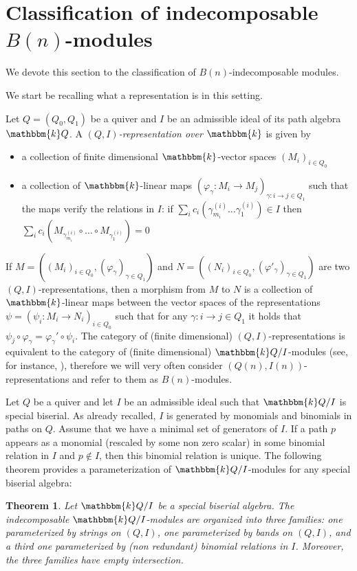 \documentclass[11pt]{amsart}
\newtheorem{theorem}{Theorem}[section]
\theoremstyle{definition}
\newcommand{\kk}{\mathbbm{k}}
\begin{document}
\section{Classification of indecomposable $B(n)$-modules}\label{sec : RepTh of B(r)}
We devote this section to the classification of $B(n)$-indecomposable modules. 

We start be recalling what a representation is in this setting.

Let $Q=(Q_0,Q_1)$ be a quiver and $I$ be an admissible ideal of its path algebra $\kk Q$. A \emph{$(Q,I)$-representation over $\kk$} is given by
\begin{itemize}
    \item a collection of finite dimensional $\kk$-vector spaces $(M_i)_{i\in Q_0}$
    \item a collection of $\kk$-linear maps $(\varphi_{\gamma}: M_i\to M_j)_{\gamma:i\to j\in Q_1}$
  such that the maps verify the relations in $I$: if $\sum_i c_i(\gamma_{m_i}^{(i)}\ldots \gamma_1^{(i)})\in I$ then $\sum_i c_i({M_{\gamma_{m_i}^{(i)}}\circ \ldots \circ M_{ \gamma_1^{(i)}}})=0$
\end{itemize}
If $M=((M_i)_{i\in Q_0}, (\varphi_\gamma)_{\gamma \in Q_1})$ and $N=((N_i)_{i\in Q_0}, (\varphi'_\gamma)_{\gamma \in Q_1})$ are two $(Q,I)$-representations, then a morphism from $M$ to $N$ is a collection of $\kk$-linear maps between the vector spaces of the representations $\psi=(\psi_i:M_i\rightarrow N_i)_{i\in Q_0}$ such that for any $\gamma:i\to j\in Q_1$ it holds that $\psi_j\circ\varphi_\gamma=\varphi_\gamma'\circ\psi_i$. The category of (finite dimensional) $(Q,I)$-representations is equivalent to the category of (finite dimensional) $\kk Q/I$-modules (see, for instance, \cite[Chapter II, Theorem 3.7]{MR2197389}), therefore we will very often consider $(Q(n),I(n))$-representations and refer to them as $B(n)$-modules.

Let $Q$ be a quiver and let $I$ be an admissible ideal such that $\kk Q/I$ is special biserial. As already recalled, $I$ is generated by monomials and binomials in paths on $Q$. Assume that we have a minimal set of generators of $I$. If a path $p$ appears as a monomial (rescaled by some non zero scalar) in some binomial relation in $I$ and $p\not\in I$, then this binomial relation is unique. The following theorem provides a parameterization of $\kk Q/I$-modules for any special biserial algebra:
\begin{theorem}\label{thm : classification first version}\cite[Proposition 2.3]{WW} Let $\kk Q/I$ be a special biserial algebra.  
The indecomposable $\kk Q/I$-modules are organized into three families: one parameterized by strings on $(Q,I)$, one parameterized by bands on $(Q,I)$, and a third one parameterized by (non redundant) binomial relations in $I$. Moreover, the three families have empty intersection. 
\end{theorem}
\end{document}
